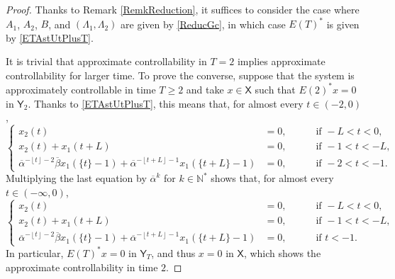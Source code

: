 \documentclass[10pt]{amsart}
\theoremstyle{plain}
\theoremstyle{definition}
\newcommand{\floor}[1]{\left\lfloor #1 \right\rfloor}
\begin{document}
\begin{proof}
Thanks to Remark \ref{RemkReduction}, it suffices to consider the case where $A_1$, $A_2$, $B$, and $(\Lambda_1, \Lambda_2)$ are given by \eqref{ReducGc}, in which case $E(T)^\ast$ is given by \eqref{ETAstUtPlusT}.

It is trivial that approximate controllability in $T = 2$ implies approximate controllability for larger time. To prove the converse, suppose that the system is approximately controllable in time $T \geq 2$ and take $x \in \mathsf X$ such that $E(2)^\ast x = 0$ in $\mathsf Y_2$. Thanks to \eqref{ETAstUtPlusT}, this means that, for almost every $t \in (-2, 0)$,
\[
\left\{
\begin{aligned}
x_2(t) & = 0, & \quad & \text{ if } -L < t < 0, \\
x_2(t) + x_1(t + L) & = 0, & & \text{ if } -1 < t < -L, \\
\overline\alpha^{-\floor{t} - 2} \overline\beta x_1(\{t\} - 1) + \overline\alpha^{-\floor{t + L} - 1} x_1(\{t + L\} - 1) & = 0, & & \text{ if } -2 < t < -1.
\end{aligned}
\right.
\]
Multiplying the last equation by $\overline\alpha^k$ for $k \in \mathbb N^\ast$ shows that, for almost every $t \in (-\infty, 0)$,
\[
\left\{
\begin{aligned}
x_2(t) & = 0, & \quad & \text{ if } -L < t < 0, \\
x_2(t) + x_1(t + L) & = 0, & & \text{ if } -1 < t < -L, \\
\overline\alpha^{-\floor{t} - 2} \overline\beta x_1(\{t\} - 1) + \overline\alpha^{-\floor{t + L} - 1} x_1(\{t + L\} - 1) & = 0, & & \text{ if } t < -1.
\end{aligned}
\right.
\]
In particular, $E(T)^\ast x = 0$ in $\mathsf Y_T$, and thus $x = 0$ in $\mathsf X$, which shows the approximate controllability in time $2$.


\end{proof}
\end{document}
